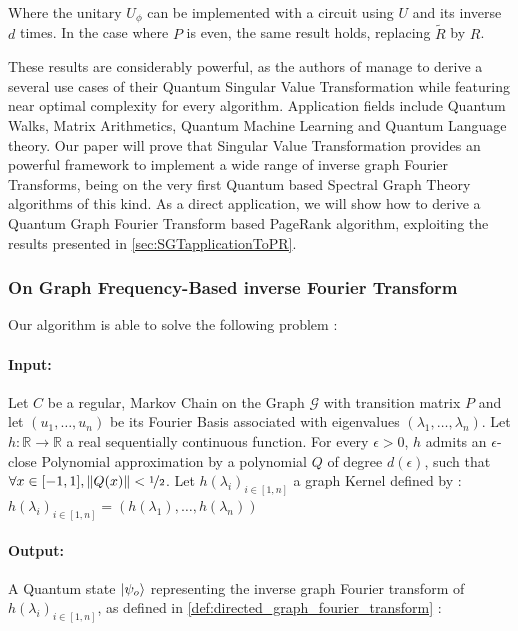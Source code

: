 \documentclass[sn-mathphys]{sn-jnl}%
\theoremstyle{thmstyleone}%
\theoremstyle{thmstyletwo}%
\theoremstyle{thmstylethree}%
\begin{document}
Where the unitary $U_\phi$ can be implemented with a circuit using $U$
and its inverse $d$ times. In the case where $P$ is even, the same
result holds, replacing $\widetilde{R}$ by $R$.

These results are considerably powerful, as the authors of
\cite{gilyen_su_low_wiebe_2019} manage to derive a several use cases
of their Quantum Singular Value Transformation while featuring near
optimal complexity for every algorithm. Application fields include
Quantum Walks, Matrix Arithmetics, Quantum Machine Learning and
Quantum Language theory. Our paper will prove that Singular Value
Transformation provides an powerful framework to implement a wide
range of inverse graph Fourier Transforms, being on the very first
Quantum based Spectral Graph Theory algorithms of this kind. As a
direct application, we will show how to derive a Quantum Graph Fourier
Transform based PageRank algorithm, exploiting the results presented
in \ref{sec:SGTapplicationToPR}.

\subsubsection{On Graph Frequency-Based inverse Fourier Transform}

Our algorithm is able to solve the following problem :

\paragraph{Input:}\label{par:algo_1_inputs} Let $C$ be a regular, Markov Chain on the Graph $\mathcal{G}$ with transition
matrix $P$ and let $(u_1, \hdots, u_n)$ be its Fourier Basis
associated with eigenvalues $(\lambda_1, \hdots, \lambda_n)$. Let
$h: \mathbb{R} \rightarrow \mathbb{R} $ a real sequentially continuous
function. For every $\epsilon > 0$, $h$ admits an $\epsilon$-close
Polynomial approximation by a polynomial $Q$ of degree $d(\epsilon)$,
such that $\forall x \in [-1,1], \|Q(x)\|< \nicefrac{1}{2}$. Let
$h(\lambda_i)_{i\in [1, n]}$ a graph Kernel defined by :
$h(\lambda_i)_{i\in [1, n]}=(h(\lambda_1), \hdots, h(\lambda_n))$

\paragraph{Output:} A Quantum state $\ket{\psi_o}$ representing the
inverse graph Fourier transform of $h(\lambda_i)_{i\in [1, n]}$, as
defined in \ref{def:directed_graph_fourier_transform} :
\end{document}
